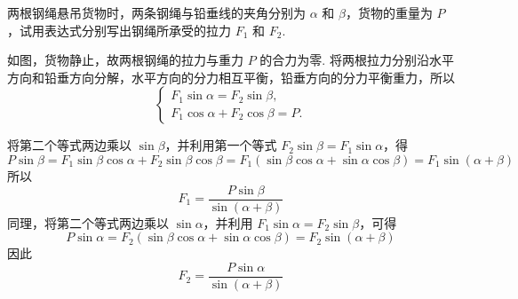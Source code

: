 \begin{problem}
两根钢绳悬吊货物时，两条钢绳与铅垂线的夹角分别为 \(\alpha\) 和 \(\beta\)，货物的重量为 \(P\)，试用表达式分别写出钢绳所承受的拉力 \(F_1\) 和 \(F_2\).
\end{problem}

\begin{solution}
如图，货物静止，故两根钢绳的拉力与重力 \(P\) 的合力为零. 将两根拉力分别沿水平方向和铅垂方向分解，水平方向的分力相互平衡，铅垂方向的分力平衡重力，所以
\[
\begin{cases}
F_1\sin\alpha=F_2\sin\beta,\\
F_1\cos\alpha+F_2\cos\beta=P.
\end{cases}
\]


将第二个等式两边乘以 \(\sin\beta\)，并利用第一个等式 \(F_2\sin\beta=F_1\sin\alpha\)，得
\[
P\sin\beta=F_1\sin\beta\cos\alpha+F_2\sin\beta\cos\beta=F_1\left(\sin\beta\cos\alpha+\sin\alpha\cos\beta\right)=F_1\sin\left(\alpha+\beta\right)
\]
所以
\[
F_1=\dfrac{P\sin\beta}{\sin\left(\alpha+\beta\right)}
\]
同理，将第二个等式两边乘以 \(\sin\alpha\)，并利用 \(F_1\sin\alpha=F_2\sin\beta\)，可得
\[
P\sin\alpha=F_2\left(\sin\beta\cos\alpha+\sin\alpha\cos\beta\right)=F_2\sin\left(\alpha+\beta\right)
\]
因此
\[
F_2=\dfrac{P\sin\alpha}{\sin\left(\alpha+\beta\right)}
\]
\end{solution}
